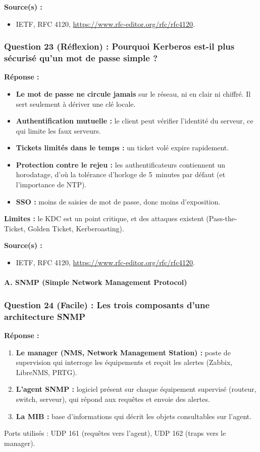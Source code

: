 \documentclass[12pt,a4paper]{article}
\newcommand{\reponse}{\textbf{Réponse :}\par}
\newcommand{\sources}{\textbf{Source(s) :}}
\begin{document}
\sources
\begin{itemize}
    \item IETF, RFC 4120, \url{https://www.rfc-editor.org/rfc/rfc4120}.
\end{itemize}

\subsubsection*{Question 23 (Réflexion) : Pourquoi Kerberos est-il plus sécurisé qu'un mot de passe simple ?}

\reponse
\begin{itemize}
    \item \textbf{Le mot de passe ne circule jamais} sur le réseau, ni
    en clair ni chiffré. Il sert seulement à dériver une clé locale.
    \item \textbf{Authentification mutuelle :} le client peut vérifier
    l'identité du serveur, ce qui limite les faux serveurs.
    \item \textbf{Tickets limités dans le temps :} un ticket volé expire
    rapidement.
    \item \textbf{Protection contre le rejeu :} les authentificateurs
    contiennent un horodatage, d'où la tolérance d'horloge de
    5~minutes par défaut (et l'importance de NTP).
    \item \textbf{SSO :} moins de saisies de mot de passe, donc moins
    d'exposition.
\end{itemize}

\textbf{Limites :} le KDC est un point critique, et des attaques
existent (Pass-the-Ticket, Golden Ticket, Kerberoasting).

\sources
\begin{itemize}
    \item IETF, RFC 4120, \url{https://www.rfc-editor.org/rfc/rfc4120}.
\end{itemize}

\paragraph{A. SNMP (Simple Network Management Protocol)}

\subsubsection*{Question 24 (Facile) : Les trois composants d'une architecture SNMP}

\reponse
\begin{enumerate}
    \item \textbf{Le manager (NMS, Network Management Station) :} poste
    de supervision qui interroge les équipements et reçoit les alertes
    (Zabbix, LibreNMS, PRTG).
    \item \textbf{L'agent SNMP :} logiciel présent sur chaque équipement
    supervisé (routeur, switch, serveur), qui répond aux requêtes et
    envoie des alertes.
    \item \textbf{La MIB :} base d'informations qui décrit les objets
    consultables sur l'agent.
\end{enumerate}
Ports utilisés : UDP 161 (requêtes vers l'agent), UDP 162 (traps vers
le manager).
\end{document}

